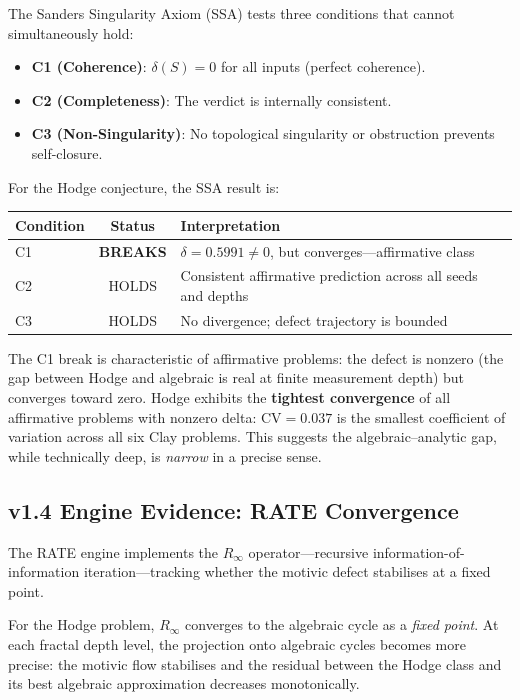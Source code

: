 \documentclass[11pt]{article}
\theoremstyle{definition}
\begin{document}
The Sanders Singularity Axiom (SSA) tests three conditions that cannot
simultaneously hold:

\begin{itemize}
  \item \textbf{C1 (Coherence)}: $\delta(S) = 0$ for all inputs (perfect
    coherence).
  \item \textbf{C2 (Completeness)}: The verdict is internally consistent.
  \item \textbf{C3 (Non-Singularity)}: No topological singularity or
    obstruction prevents self-closure.
\end{itemize}

\noindent
For the Hodge conjecture, the SSA result is:

\begin{center}
\begin{tabular}{lcl}
\hline
\textbf{Condition} & \textbf{Status} & \textbf{Interpretation} \\
\hline
C1 & \textbf{BREAKS} &
  $\delta = 0.5991 \neq 0$, but converges---affirmative class \\
C2 & HOLDS &
  Consistent affirmative prediction across all seeds and depths \\
C3 & HOLDS &
  No divergence; defect trajectory is bounded \\
\hline
\end{tabular}
\end{center}

\noindent
The C1 break is characteristic of affirmative problems: the defect is
nonzero (the gap between Hodge and algebraic is real at finite
measurement depth) but converges toward zero.  Hodge exhibits the
\textbf{tightest convergence} of all affirmative problems with nonzero
delta: $\mathrm{CV} = 0.037$ is the smallest coefficient of variation
across all six Clay problems.  This suggests the algebraic--analytic
gap, while technically deep, is \emph{narrow} in a precise sense.

\subsection{v1.4 Engine Evidence: RATE Convergence}
\label{sec:rate}

The RATE engine implements the $R_\infty$ operator---recursive
information-of-information iteration---tracking whether the motivic defect
stabilises at a fixed point.

For the Hodge problem, $R_\infty$ converges to the algebraic cycle as
a \emph{fixed point}.  At each fractal depth level, the projection onto
algebraic cycles becomes more precise: the motivic flow stabilises and
the residual between the Hodge class and its best algebraic approximation
decreases monotonically.
\end{document}
